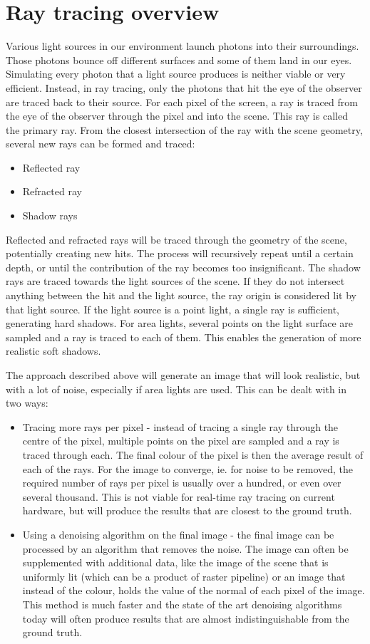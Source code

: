 \documentclass[times, utf8, zavrsni, numeric]{fer}
\begin{document}
\section{Ray tracing overview}
Various light sources in our environment launch photons into their surroundings. Those photons bounce off different surfaces and some of them land in our eyes. Simulating every photon that a light source produces is neither viable or very efficient. Instead, in ray tracing, only the photons that hit the eye of the observer are traced back to their source. For each pixel of the screen, a ray is traced from the eye of the observer through the pixel and into the scene. This ray is called the primary ray. From the closest intersection of the ray with the scene geometry, several new rays can be formed and traced:
\begin{itemize}
	\item Reflected ray
	\item Refracted ray
	\item Shadow rays
\end{itemize}

Reflected and refracted rays will be traced through the geometry of the scene, potentially creating new hits. The process will recursively repeat until a certain depth, or until the contribution of the ray becomes too insignificant. The shadow rays are traced towards the light sources of the scene. If they do not intersect anything between the hit and the light source, the ray origin is considered lit by that light source. If the light source is a point light, a single ray is sufficient, generating hard shadows. For area lights, several points on the light surface are sampled and a ray is traced to each of them. This enables the generation of more realistic soft shadows.

The approach described above will generate an image that will look realistic, but with a lot of noise, especially if area lights are used. This can be dealt with in two ways:
\begin{itemize}
	\item {Tracing more rays per pixel - instead of tracing a single ray through the centre of the pixel, multiple points on the pixel are sampled and a ray is traced through each. The final colour of the pixel is then the average result of each of the rays. For the image to converge, ie. for noise to be removed, the required number of rays per pixel is usually over a hundred, or even over several thousand. This is not viable for real-time ray tracing on current hardware, but will produce the results that are closest to the ground truth.}
	\item {Using a denoising algorithm on the final image - the final image can be processed by an algorithm that removes the noise. The image can often be supplemented with additional data, like the image of the scene that is uniformly lit (which can be a product of raster pipeline) or an image that instead of the colour, holds the value of the normal of each pixel of the image. This method is much faster and the state of the art denoising algorithms today will often produce results that are almost indistinguishable from the ground truth.}
\end{itemize}
\end{document}

